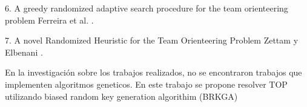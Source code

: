 6.
A greedy randomized adaptive search procedure for the team orienteering problem Ferreira et al. \cite{FerreiraQuintasOliveiraPereiraDias}.

7.
A novel Randomized Heuristic for the Team Orienteering Problem Zettam y Elbenani \cite{ZettamElbenani}.


\bigskip

En la investigación sobre los trabajos realizados, no se encontraron trabajos que implementen algoritmos geneticos. En este trabajo se propone resolver TOP utilizando biased random key generation algorithim (BRKGA)









